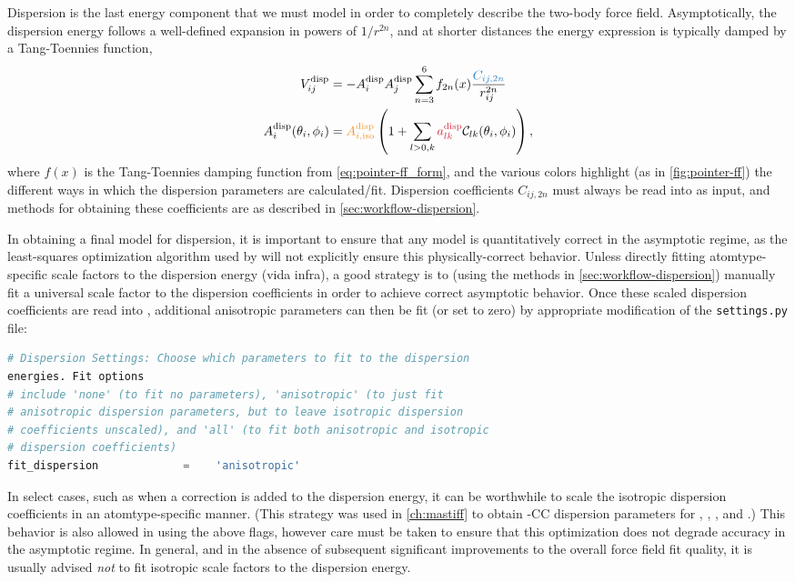 Dispersion is the last energy component that we must model in order to
completely describe the two-body force field. Asymptotically, the dispersion energy follows a
well-defined expansion in powers of $1/r^{2n}$, and at shorter distances the
energy expression is typically damped by a Tang-Toennies
function,\cite{Tang1984,Tang1992} 
%
\begin{align}
\vdisp_{ij} &= -{\Adisp{i}\Adisp{j}} \sum\limits_{n=3}^{6} f_{2n}(x)
\frac{\textcolor{mon}{C_{ij,2n}}}{r_{ij}^{2n}} \\
\Adisp{i}(\theta_i,\phi_i) &=
\textcolor{cfit}{\Adisp{i,\text{iso}}}
\left(1 +
\sum\limits_{l>0,k} \textcolor{fit}{\adisp}  \mathcal{C}_{lk}(\theta_i,\phi_i)
\right),
\end{align}
%
where $f(x)$ is the Tang-Toennies damping function from
\cref{eq:pointer-ff_form}, and the various colors highlight (as in
\cref{fig:pointer-ff}) the different ways in which the dispersion parameters
are calculated/fit.
Dispersion coefficients 
${C_{ij,2n}}$
must always be read into
\pointer as input, and methods for obtaining these coefficients are as
described in  \cref{sec:workflow-dispersion}. 

In obtaining a final model for dispersion, it is important to ensure that any
model is quantitatively correct in the asymptotic regime, as the
least-squares optimization algorithm used by \pointer will not explicitly ensure this
physically-correct behavior. Unless directly fitting atomtype-specific scale
factors to the dispersion energy (vida infra), a good strategy is to (using
the methods in \cref{sec:workflow-dispersion}) manually fit a universal scale factor to
the dispersion coefficients in order to achieve correct asymptotic behavior.
Once these scaled dispersion coefficients are read into \pointer, additional
anisotropic parameters can then be fit (or set to zero) by appropriate
modification of the \verb|settings.py| file:
\begin{lstlisting}[language=python]
# Dispersion Settings: Choose which parameters to fit to the dispersion
energies. Fit options
# include 'none' (to fit no parameters), 'anisotropic' (to just fit
# anisotropic dispersion parameters, but to leave isotropic dispersion
# coefficients unscaled), and 'all' (to fit both anisotropic and isotropic
# dispersion coefficients)
fit_dispersion             =    'anisotropic'
\end{lstlisting}

In select cases, such as when a \dccsdt correction is added to the
dispersion energy, it can be worthwhile to scale the isotropic
dispersion coefficients in an atomtype-specific manner. (This strategy was
used in \cref{ch:mastiff} to obtain \mastiff-CC dispersion parameters for \co, \nh, \ho,
and \cl.) This behavior is also allowed in \pointer using the above flags,
however care must be taken to ensure that this optimization does not degrade
accuracy in the asymptotic regime. In general, 
and in the absence
of subsequent significant improvements to the overall force field fit quality,
it is usually advised
\emph{not} to fit isotropic scale factors to the dispersion energy. 

